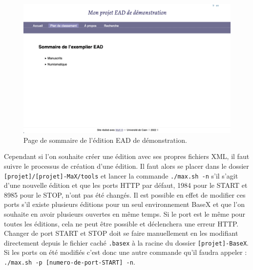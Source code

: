 \documentclass[a4paper,12pt,twoside]{book}
\begin{document}
\begin{figure}[H]
    \centering
    \includegraphics[width=13cm]{img/partie_2/demoead.png}
    \caption{Page de sommaire de l'édition EAD de démonstration.}
    \label{demo-ead}
\end{figure}

Cependant si l'on souhaite créer une édition avec ses propres fichiers XML, il faut suivre le processus de création d'une édition. Il faut alors se placer dans le dossier \texttt{[projet]/[projet]-MaX/tools} et lancer la commande \texttt{./max.sh -n} s'il s'agit d'une nouvelle édition et que les ports HTTP par défaut, 1984 pour le START et 8985 pour le STOP, n'ont pas été changés. Il est possible en effet de modifier ces ports s'il existe plusieurs éditions pour un seul environnement BaseX et que l'on souhaite en avoir plusieurs ouvertes en même temps. Si le port est le même pour toutes les éditions, cela ne peut être possible et déclenchera une erreur HTTP. Changer de port START et STOP doit se faire manuellement en les modifiant directement depuis le fichier caché \texttt{.basex} à la racine du dossier \texttt{[projet]-BaseX}. Si les ports on été modifiés c'est donc une autre commande qu'il faudra appeler : \texttt{./max.sh -p [numero-de-port-START] -n}.
\end{document}
